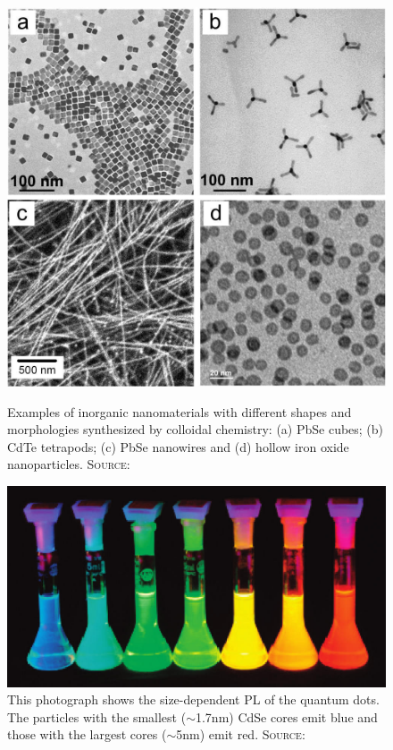 	\begin{figure}[htbp]
		\begin{minipage}[t]{0.49\textwidth}
			\centering
			\includegraphics[width=\textwidth]{Fig/QDshapes.jpg}
			\caption{Examples of inorganic nanomaterials with different
							 shapes and morphologies synthesized by colloidal chemistry:
							 (a) PbSe cubes; (b) CdTe tetrapods; (c) PbSe nanowires and
							 (d) hollow iron oxide nanoparticles.
							 {\scshape Source:} \cite[p.394]{Talapin}}
			\label{fig:QDshapes}
		\end{minipage}
		\hfill
		\begin{minipage}[t]{0.49\textwidth}
			\centering
			\includegraphics[width=\textwidth]{Fig/QDcolor.jpg}
			\caption{This photograph shows the size-dependent \gls{PL} of the quantum dots. The particles with the smallest ($\sim$1.7nm)
							 CdSe cores emit blue and those with the largest cores ($\sim$5nm) emit red.
							 {\scshape Source:} \cite[p.393]{Talapin}}
			\label{fig:QDcolor}
		\end{minipage}
	\end{figure}			

